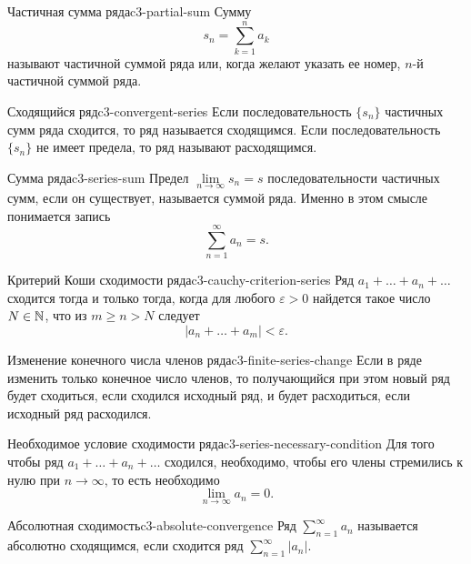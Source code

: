 \begin{definition}{Частичная сумма ряда}{c3-partial-sum}
  Сумму
  \[
    s_n=\sum_{k=1}^{n}a_k
  \]
  называют частичной суммой ряда или, когда желают указать ее номер,
  $n$-й частичной суммой ряда.
\end{definition}

\begin{definition}{Сходящийся ряд}{c3-convergent-series}
  Если последовательность $\{s_n\}$ частичных сумм ряда сходится, то ряд
  называется сходящимся. Если последовательность $\{s_n\}$ не имеет
  предела, то ряд называют расходящимся.
\end{definition}

\begin{definition}{Сумма ряда}{c3-series-sum}
  Предел $\lim\limits_{n\to\infty}s_n=s$ последовательности частичных сумм,
  если он существует, называется суммой ряда. Именно в этом смысле
  понимается запись
  \[
    \sum_{n=1}^{\infty}a_n=s.
  \]
\end{definition}

\begin{theorem}{Критерий Коши сходимости ряда}{c3-cauchy-criterion-series}
  Ряд $a_1+\ldots+a_n+\ldots$ сходится тогда и только тогда, когда для
  любого $\varepsilon>0$ найдется такое число $N\in\mathbb{N}$, что из
  $m\ge n>N$ следует
  \[
    |a_n+\ldots+a_m|<\varepsilon.
  \]
\end{theorem}

\begin{corollary}{Изменение конечного числа членов ряда}{c3-finite-series-change}
  Если в ряде изменить только конечное число членов, то получающийся при
  этом новый ряд будет сходиться, если сходился исходный ряд, и будет
  расходиться, если исходный ряд расходился.
\end{corollary}

\begin{corollary}{Необходимое условие сходимости ряда}{c3-series-necessary-condition}
  Для того чтобы ряд $a_1+\ldots+a_n+\ldots$ сходился, необходимо, чтобы
  его члены стремились к нулю при $n\to\infty$, то есть необходимо
  \[
    \lim_{n\to\infty}a_n=0.
  \]
\end{corollary}

\begin{definition}{Абсолютная сходимость}{c3-absolute-convergence}
  Ряд $\sum\limits_{n=1}^{\infty}a_n$ называется абсолютно сходящимся,
  если сходится ряд $\sum\limits_{n=1}^{\infty}|a_n|$.
\end{definition}

